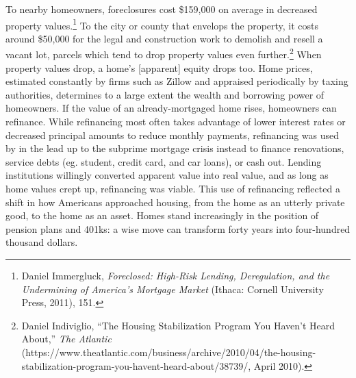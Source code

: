 \documentclass[12pt,oneside]{psthesis}
\begin{document}
To nearby homeowners, foreclosures cost \$159,000 on average in decreased property values.\footnote{Daniel Immergluck, \emph{Foreclosed: High-Risk Lending, Deregulation, and the Undermining of America's Mortgage Market} (Ithaca: Cornell University Press, 2011), 151.}
To the city or county that envelops the property, it costs around \$50,000 for the legal and construction work to demolish and resell a vacant lot, parcels which tend to drop property values even further.\footnote{Daniel Indiviglio, ``The Housing Stabilization Program You Haven't Heard About,'' \emph{The Atlantic} (https://www.theatlantic.com/business/archive/2010/04/the-housing-stabilization-program-you-havent-heard-about/38739/, April 2010).}
When property values drop, a home's {[}apparent{]} equity drops too.
Home prices, estimated constantly by firms such as Zillow and appraised periodically by taxing authorities, determines to a large extent the wealth and borrowing power of homeowners.
If the value of an already-mortgaged home rises, homeowners can refinance.
While refinancing most often takes advantage of lower interest rates or decreased principal amounts to reduce monthly payments, refinancing was used by in the lead up to the subprime mortgage crisis instead to finance renovations, service debts (eg. student, credit card, and car loans), or cash out.
Lending institutions willingly converted apparent value into real value, and as long as home values crept up, refinancing was viable.
This use of refinancing reflected a shift in how Americans approached housing, from the home as an utterly private good, to the home as an asset.
Homes stand increasingly in the position of pension plans and 401ks: a wise move can transform forty years into four-hundred thousand dollars.
\end{document}
